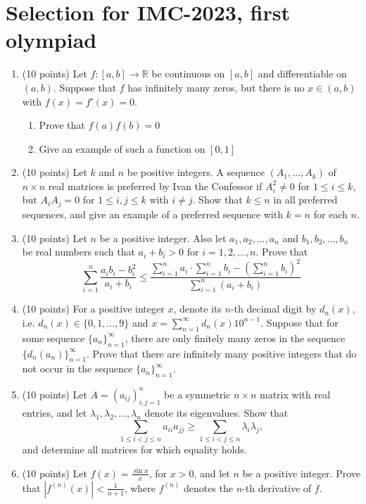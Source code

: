 \documentclass{article}
\begin{document}
\pagestyle{plain}

\section*{Selection for IMC-2023, first olympiad}

\begin{enumerate}
  \item (10 points) Let $f: [a, b] \rightarrow \mathbb{R}$ be continuous on $[a, b]$ and differentiable on $(a, b)$. Suppose that $f$ has infinitely many zeros, but there is no $x \in (a, b)$ with $f(x) = f'(x) = 0$.
  \begin{enumerate}
    \item Prove that $f(a)f(b) = 0$
    \item Give an example of such a function on $[0, 1]$
  \end{enumerate}
  
  \item (10 points) Let $k$ and $n$ be positive integers. 
  A sequence $(A_1, . . . , A_k)$ of $n \times n$ real matrices is 
  preferred by Ivan the Confessor if $A_i^2 \neq 0$ 
  for $1 \leq i \leq k$, but $A_iA_j = 0$ for $1 \leq i, j \leq k$ 
  with $i \neq j$. Show that $k \leq n$ in all preferred sequences, 
  and give an example of a preferred sequence with $k = n$ for each $n$.
  
  \item (10 points) Let $n$ be a positive integer. Also let $a_1, a_2, . . . , a_n$ and 
  $b_1, b_2, . . . , b_n$ be real numbers such that $a_i + b_i > 0$ 
  for $i = 1, 2, . . . , n$. Prove that
  \[
  \sum_{i=1}^{n} \frac{a_ib_i - b_i^2}{a_i + b_i} \leq \frac{\sum_{i=1}^{n} a_i \cdot \sum_{i=1}^{n} b_i - \left(\sum_{i=1}^{n} b_i\right)^2}{\sum_{i=1}^{n}\left(a_i + b_i\right)}
  \]

  \item (10 points) For a positive integer $x$, denote its $n$-th 
  decimal digit by $d_n(x)$, i.e. $d_n(x) \in \{0, 1, . . ., 9\}$ 
  and $x = \sum_{n=1}^{\infty} d_n(x)10^{n-1}$. 
  Suppose that for some sequence $\{a_n\}_{n=1}^{\infty}$, 
  there are only finitely many zeros in the sequence 
  $\{d_n(a_n)\}_{n=1}^{\infty}$. 
  Prove that there are infinitely many positive integers that do not occur 
  in the sequence $\{a_n\}_{n=1}^{\infty}$.
    
  \item (10 points) Let $A = (a_{ij})_{i,j=1}^n$ be a symmetric 
  $n \times n$ matrix with real entries, 
  and let $\lambda_1, \lambda_2, . . . , \lambda_n$ denote its eigenvalues. 
  Show that $$\sum_{1 \leq i < j \leq n} a_{ii}a_{jj} \geq \sum_{1 \leq i < j \leq n} \lambda_i\lambda_j,$$
  and determine all matrices for which equality holds.

  \item (10 points) Let $f(x) = \frac{\sin x}{x}$, for $x > 0$, 
  and let $n$ be a positive integer. 
  Prove that $|f^{(n)}(x)| < \frac{1}{n + 1}$, 
  where $f^{(n)}$ denotes the $n$-th derivative of $f$.    
\end{enumerate}
\end{document}
